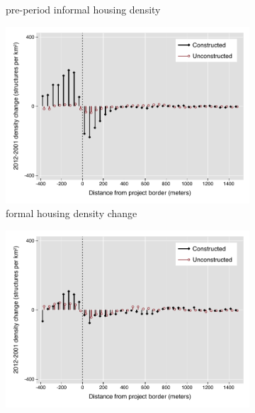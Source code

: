 \documentclass[12pt]{article}
\begin{document}
\begin{figure}[h!]
\begin{subfigure}[b]{0.495\textwidth}
            \caption[]%
            {{\small pre-period informal housing density}}    
            \label{fig:preinf}
        \end{subfigure}
        \label{fig:rawbblumeans}
        \vspace{-6mm}
        \centering
        \caption[ Changes in Housing Densities in Constructed and Unconstructed Projects Areas]
        {\small 0.5km Square Fixed Effects (100 grid cells within)  Housing Densities in Constructed and Unconstructed projects } 
        \begin{subfigure}[b]{0.495\textwidth}   
            \centering 
            \includegraphics[width=\textwidth,trim={0.3cm .3cm 0.1cm 0cm}, clip=true]{figures/bblu_for_rawchanges_4_5k.pdf}
            \caption[]%
            {{\small formal housing density change}}    
            \label{fig:forchange}
        \end{subfigure}
        \hfill
        \begin{subfigure}[b]{0.495\textwidth}   
            \centering 
            \includegraphics[width=\textwidth,trim={0.3cm .3cm 0.1cm 0cm}, clip=true]{figures/bblu_inf_rawchanges_4_5k.pdf}

\end{subfigure}
\end{figure}
\end{document}
